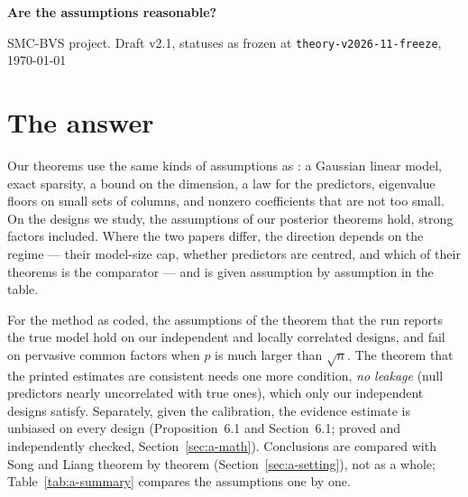 \documentclass[11pt]{article}
\begin{document}
\begin{center}
{\Large\bfseries Are the assumptions reasonable?}\par\smallskip
{\small SMC-BVS project. Draft v2.1, statuses as frozen at \texttt{theory-v2026-11-freeze}, \today}
\end{center}

\section{The answer}\label{sec:a-answer}

Our theorems use the same kinds of assumptions as \citet{SongLiang2015}: a Gaussian linear model, exact sparsity, a
bound on the dimension, a law for the predictors, eigenvalue floors on small sets of columns, and nonzero coefficients
that are not too small. On the designs we study, the assumptions of our posterior theorems hold, strong factors
included. Where the two papers differ, the direction depends on the regime --- their model-size cap, whether predictors
are centred, and which of their theorems is the comparator --- and is given assumption by assumption in the table.

For the method as coded, the assumptions of the theorem that the run reports the true model hold on our
independent and locally correlated designs, and fail on pervasive common factors when $p$ is much larger than $\sqrt n$.
The theorem that the printed estimates are consistent needs one more condition, \emph{no leakage} (null predictors
nearly uncorrelated with true ones), which only our independent designs satisfy. Separately, given the calibration, the
evidence estimate is unbiased on every design (Proposition~6.1 and Section~6.1; proved and independently checked, Section~\ref{sec:a-math}).
Conclusions are compared with Song and Liang theorem by theorem (Section~\ref{sec:a-setting}), not as a whole;
Table~\ref{tab:a-summary} compares the assumptions one by one.
\end{document}
